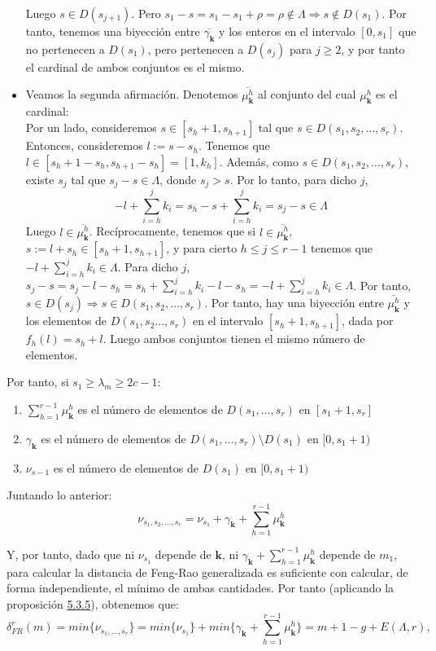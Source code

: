\documentclass[11pt,spanish]{book}
\newcommand{\fr}{\delta_{FR}^{r}(m)}
\newcommand{\la}{\lambda}
\begin{document}
\begin{itemize}
    Luego $s\in D(s_{j+1})$. Pero $s_1-s=s_1-s_1+\rho = \rho\notin \Lambda\Rightarrow s\notin D(s_1)$. Por tanto, tenemos una biyección entre $\overline{\gamma_{\mathbf{k}}}$ y los enteros en el intervalo $[0,s_1]$ que no pertenecen a $D(s_1)$, pero pertenecen a $D(s_j)$ para $j\geq 2$, y por tanto el cardinal de ambos conjuntos es el mismo.
    \item Veamos la segunda afirmación. Denotemos $\overline{\mu_{\mathbf{k}}^h}$ al conjunto del cual $\mu_{\mathbf{k}}^h$ es el cardinal:\\
   Por un lado, consideremos $s\in[s_h+1,s_{h+1}]$ tal que $s\in D(s_1,s_2,\ldots,s_r)$. Entonces, consideremos $l:=s-s_h$. Tenemos que $l\in[s_{h}+1-s_{h},s_{h+1}-s_{h}]=[1,k_h]$. Además, como $s\in D(s_1,s_2,\ldots,s_r)$, existe $s_j$ tal que $s_j-s\in \Lambda$, donde $s_j>s$. Por lo tanto, para dicho $j$,
   $$-l+\sum_{i=h}^{j}k_{i}=s_h-s+\sum_{i=h}^{j}k_{i}=s_j-s\in \Lambda$$
   Luego $l\in\overline{\mu_{\mathbf{k}}^h}$. Recíprocamente, tenemos que si $l\in \overline{\mu_{\mathbf{k}}^h}$, $s:=l+s_h\in[s_h+1,s_{h+1}]$, y para cierto $h\leq j\leq r-1$ tenemos que $-l+\sum_{i=h}^{j}k_i\in \Lambda$. Para dicho $j$, $s_j-s=s_j-l-s_h=s_h+\sum_{i=h}^{j}k_i-l-s_h=-l+\sum_{i=h}^{j}k_i\in \Lambda$. Por tanto, $s\in D(s_j)\Rightarrow s\in D(s_1,s_2,\ldots,s_r)$. Por tanto, hay una biyección entre $\overline{\mu_{\mathbf{k}}^h}$ y los elementos de $D(s_1,s_2\ldots,s_r)$ en el intervalo $[s_h+1,s_{h+1}]$, dada por $f_h(l)=s_h+l$. Luego ambos conjuntos tienen el mismo número de elementos.\\
\end{itemize}

Por tanto, si  $s_1\geq \la_m\geq 2c-1$:
\begin{enumerate}
    \item $\sum_{h=1}^{r-1}\mu_{\mathbf{k}}^{h}$ es el número de elementos de $D(s_1,\ldots,s_r)$ en $[s_1+1,s_r]$
    \item $\gamma_{\mathbf{k}}$ es el número de elementos de $D(s_1,\ldots,s_r)\setminus D(s_1)$ en $[0,s_1+1)$
    \item $\nu_{s-1}$ es el número de elementos de $D(s_1)$ en $[0,s_1+1)$
\end{enumerate}

Juntando lo anterior:
$$\nu_{s_1,s_2,\ldots,s_r} = \nu_{s_1}+\gamma_{\mathbf{k}}+\sum_{h=1}^{r-1}\mu_{\mathbf{k}}^{h}$$

Y, por tanto, dado que ni $\nu_{s_1}$ depende de $\mathbf{k}$, ni $\gamma_{\mathbf{k}}+\sum_{h=1}^{r-1}\mu_{\mathbf{k}}^{h}$ depende de $m_1$, para calcular la distancia de Feng-Rao generalizada es suficiente con calcular, de forma independiente, el mínimo de ambas cantidades. Por tanto (aplicando la proposición \hyperlink{prop5.4.6}{5.3.5}), obtenemos que:
$$\fr = min\{\nu_{s_1,\ldots,s_r}\}=min\{\nu_{s_1}\}+min\{\gamma_{\mathbf{k}}+\sum_{h=1}^{r-1}\mu_{\mathbf{k}}^{h}\}=m+1-g+E(\Lambda,r),$$
\end{document}
